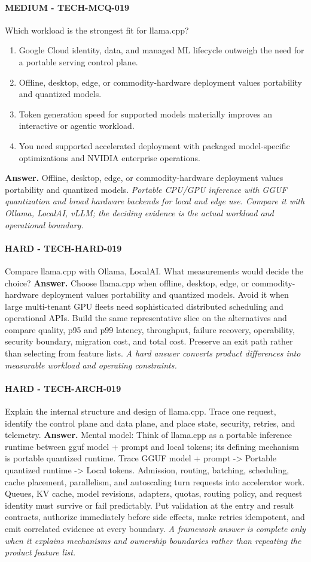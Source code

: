 \paragraph{MEDIUM - TECH-MCQ-019} Which workload is the strongest fit for llama.cpp?
\begin{enumerate}[label=\Alph*.]
\item Google Cloud identity, data, and managed ML lifecycle outweigh the need for a portable serving control plane.
\item Offline, desktop, edge, or commodity-hardware deployment values portability and quantized models.
\item Token generation speed for supported models materially improves an interactive or agentic workload.
\item You need supported accelerated deployment with packaged model-specific optimizations and NVIDIA enterprise operations.
\end{enumerate}
\textbf{Answer.} Offline, desktop, edge, or commodity-hardware deployment values portability and quantized models.
\textit{Portable CPU/GPU inference with GGUF quantization and broad hardware backends for local and edge use. Compare it with Ollama, LocalAI, vLLM; the deciding evidence is the actual workload and operational boundary.}
\paragraph{HARD - TECH-HARD-019} Compare llama.cpp with Ollama, LocalAI. What measurements would decide the choice?
\textbf{Answer.} Choose llama.cpp when offline, desktop, edge, or commodity-hardware deployment values portability and quantized models. Avoid it when large multi-tenant GPU fleets need sophisticated distributed scheduling and operational APIs. Build the same representative slice on the alternatives and compare quality, p95 and p99 latency, throughput, failure recovery, operability, security boundary, migration cost, and total cost. Preserve an exit path rather than selecting from feature lists.
\textit{A hard answer converts product differences into measurable workload and operating constraints.}
\paragraph{HARD - TECH-ARCH-019} Explain the internal structure and design of llama.cpp. Trace one request, identify the control plane and data plane, and place state, security, retries, and telemetry.
\textbf{Answer.} Mental model: Think of llama.cpp as a portable inference runtime between gguf model + prompt and local tokens; its defining mechanism is portable quantized runtime. Trace GGUF model + prompt -> Portable quantized runtime -> Local tokens. Admission, routing, batching, scheduling, cache placement, parallelism, and autoscaling turn requests into accelerator work. Queues, KV cache, model revisions, adapters, quotas, routing policy, and request identity must survive or fail predictably. Put validation at the entry and result contracts, authorize immediately before side effects, make retries idempotent, and emit correlated evidence at every boundary.
\textit{A framework answer is complete only when it explains mechanisms and ownership boundaries rather than repeating the product feature list.}
